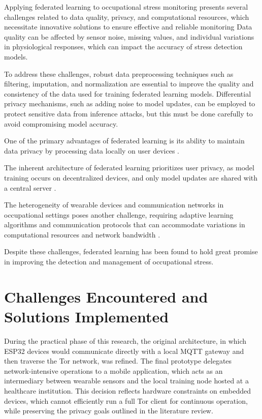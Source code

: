 \documentclass[12pt]{article}
\begin{document}
Applying federated learning to occupational stress monitoring presents several challenges related to data quality, privacy, and computational resources, which necessitate innovative solutions to ensure effective and reliable monitoring \cite{neha_gahlan_d8b04f5d, jayant_vyas_bcd9860b} Data quality can be affected by sensor noise, missing values, and individual variations in physiological responses, which can impact the accuracy of stress detection models.

To address these challenges, robust data preprocessing techniques such as filtering, imputation, and normalization are essential to improve the quality and consistency of the data used for training federated learning models. Differential privacy mechanisms, such as adding noise to model updates, can be employed to protect sensitive data from inference attacks, but this must be done carefully to avoid compromising model accuracy. 

One of the primary advantages of federated learning is its ability to maintain data privacy by processing data locally on user devices \cite{shuang_dai_ae9ca8bc, jakub_kone_n__e9c179d4}.

The inherent architecture of federated learning prioritizes user privacy, as model training occurs on decentralized devices, and only model updates are shared with a central server \cite{tomer_gafni_ff1f0d6e}. 

The heterogeneity of wearable devices and communication networks in occupational settings poses another challenge, requiring adaptive learning algorithms and communication protocols that can accommodate variations in computational resources and network bandwidth \cite{po_chen_lin_822ae077}.   

Despite these challenges, federated learning has been found to hold great promise in improving the detection and management of occupational stress. 

\section{Challenges Encountered and Solutions Implemented}

During the practical phase of this research, the original architecture, in which ESP32 devices would communicate directly with a local MQTT gateway and then traverse the Tor network, was refined. The final prototype delegates network-intensive operations to a mobile application, which acts as an intermediary between wearable sensors and the local training node hosted at a healthcare institution. This decision reflects hardware constraints on embedded devices, which cannot efficiently run a full Tor client for continuous operation, while preserving the privacy goals outlined in the literature review.
\end{document}
